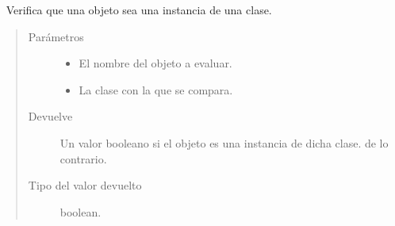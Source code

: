 \label{\detokenize{chapter_two/desc_cloudnao:module-app.utils.auxiliar_functions}}\label{\detokenize{chapter_two/desc_cloudnao:module-auxiliar_functions}}

\begin{fulllineitems}
\label{\detokenize{chapter_two/desc_cloudnao:app.utils.auxiliar_functions.check_data_type}}~
Verifica que una objeto sea una instancia de una clase.
\begin{quote}\begin{description}
\item[{Parámetros}] \leavevmode\begin{itemize}
\item {} 
 \textendash{} El nombre del objeto a evaluar.

\item {} 
 \textendash{} La clase con la que se compara.

\end{itemize}

\item[{Devuelve}] \leavevmode
Un valor booleano  si el objeto es una instancia de dicha clase.  de lo contrario.

\item[{Tipo del valor devuelto}] \leavevmode
boolean.

\end{description}\end{quote}

\end{fulllineitems}


